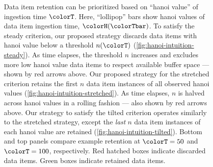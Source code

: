\begin{figure}
{  \footnotesize
  Data item retention can be prioritized based on ``hanoi value'' of ingestion time $\colorT$.
  Here, ``lollipop'' bars show hanoi values of data item ingestion time, $\colorH(\colorTbar)$.
  To satisfy the steady criterion, our proposed strategy discards data items with hanoi value below a threshold $n(\colorT)$ (\ref{fig:hanoi-intuition-steady}).
  As time elapses, the threshold $n$ increases and excludes more low hanoi value data items to respect available buffer space --- shown by red arrows above.
  Our proposed strategy for the stretched criterion retains the first $n$ data item instances of all observed hanoi values (\ref{fig:hanoi-intuition-stretched}).
  As time elapses, $n$ is halved across hanoi values in a rolling fashion --- also shown by red arrows above.
  Our strategy to satisfy the tilted criterion operates similarly to the stretched strategy, except the \textit{last} $n$ data item instances of each hanoi value are retained (\ref{fig:hanoi-intuition-tilted}).
  Bottom and top panels compare example retention at $\colorT=50$ and $\colorT=100$, respectively.
  Red hatched boxes indicate discarded data items.
  Green boxes indicate retained data items.
  }
\label{fig:hanoi-intuition}
\end{figure}
